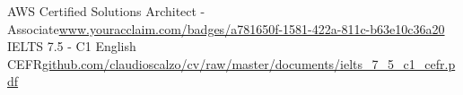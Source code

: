 



\begin{cvskills}

	\cvskill
{AWS Certified Solutions Architect - Associate}{\href{https://www.youracclaim.com/badges/a781650f-1581-422a-811c-b63e10c36a20}{www.youracclaim.com/badges/a781650f-1581-422a-811c-b63e10c36a20}}
	\cvskill
{IELTS 7.5 - C1 English CEFR}{\href{https://github.com/claudioscalzo/cv/raw/master/documents/ielts\_7\_5\_c1\_cefr.pdf}{github.com/claudioscalzo/cv/raw/master/documents/ielts\_7\_5\_c1\_cefr.pdf}}

\end{cvskills}
